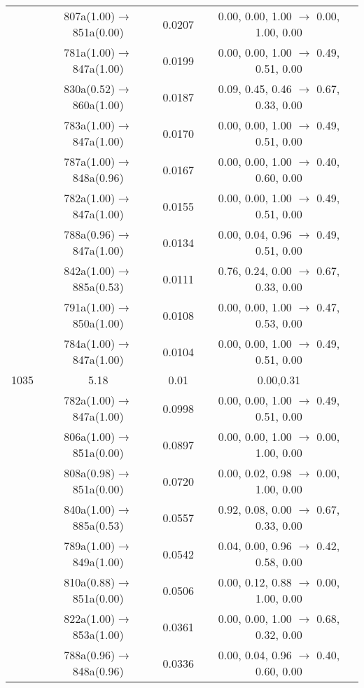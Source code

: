 \documentclass[10pt,a4paper]{article}
\begin{document}
\begin{longtable}{c|c|c|c}
 	& 807a(1.00)$\rightarrow$851a(0.00) &	 0.0207 &	 0.00, 0.00, 1.00 $\rightarrow$ 0.00, 1.00, 0.00 \\ 
 	& 781a(1.00)$\rightarrow$847a(1.00) &	 0.0199 &	 0.00, 0.00, 1.00 $\rightarrow$ 0.49, 0.51, 0.00 \\ 
 	& 830a(0.52)$\rightarrow$860a(1.00) &	 0.0187 &	 0.09, 0.45, 0.46 $\rightarrow$ 0.67, 0.33, 0.00 \\ 
 	& 783a(1.00)$\rightarrow$847a(1.00) &	 0.0170 &	 0.00, 0.00, 1.00 $\rightarrow$ 0.49, 0.51, 0.00 \\ 
 	& 787a(1.00)$\rightarrow$848a(0.96) &	 0.0167 &	 0.00, 0.00, 1.00 $\rightarrow$ 0.40, 0.60, 0.00 \\ 
 	& 782a(1.00)$\rightarrow$847a(1.00) &	 0.0155 &	 0.00, 0.00, 1.00 $\rightarrow$ 0.49, 0.51, 0.00 \\ 
 	& 788a(0.96)$\rightarrow$847a(1.00) &	 0.0134 &	 0.00, 0.04, 0.96 $\rightarrow$ 0.49, 0.51, 0.00 \\ 
 	& 842a(1.00)$\rightarrow$885a(0.53) &	 0.0111 &	 0.76, 0.24, 0.00 $\rightarrow$ 0.67, 0.33, 0.00 \\ 
 	& 791a(1.00)$\rightarrow$850a(1.00) &	 0.0108 &	 0.00, 0.00, 1.00 $\rightarrow$ 0.47, 0.53, 0.00 \\ 
 	& 784a(1.00)$\rightarrow$847a(1.00) &	 0.0104 &	 0.00, 0.00, 1.00 $\rightarrow$ 0.49, 0.51, 0.00 \\ 
 \hline1035 &	 5.18 &	 0.01 &	 0.00,0.31 \\ 
  	& 782a(1.00)$\rightarrow$847a(1.00) &	 0.0998 &	 0.00, 0.00, 1.00 $\rightarrow$ 0.49, 0.51, 0.00 \\ 
 	& 806a(1.00)$\rightarrow$851a(0.00) &	 0.0897 &	 0.00, 0.00, 1.00 $\rightarrow$ 0.00, 1.00, 0.00 \\ 
 	& 808a(0.98)$\rightarrow$851a(0.00) &	 0.0720 &	 0.00, 0.02, 0.98 $\rightarrow$ 0.00, 1.00, 0.00 \\ 
 	& 840a(1.00)$\rightarrow$885a(0.53) &	 0.0557 &	 0.92, 0.08, 0.00 $\rightarrow$ 0.67, 0.33, 0.00 \\ 
 	& 789a(1.00)$\rightarrow$849a(1.00) &	 0.0542 &	 0.04, 0.00, 0.96 $\rightarrow$ 0.42, 0.58, 0.00 \\ 
 	& 810a(0.88)$\rightarrow$851a(0.00) &	 0.0506 &	 0.00, 0.12, 0.88 $\rightarrow$ 0.00, 1.00, 0.00 \\ 
 	& 822a(1.00)$\rightarrow$853a(1.00) &	 0.0361 &	 0.00, 0.00, 1.00 $\rightarrow$ 0.68, 0.32, 0.00 \\ 
 	& 788a(0.96)$\rightarrow$848a(0.96) &	 0.0336 &	 0.00, 0.04, 0.96 $\rightarrow$ 0.40, 0.60, 0.00 \\ 

\end{longtable}
\end{document}
